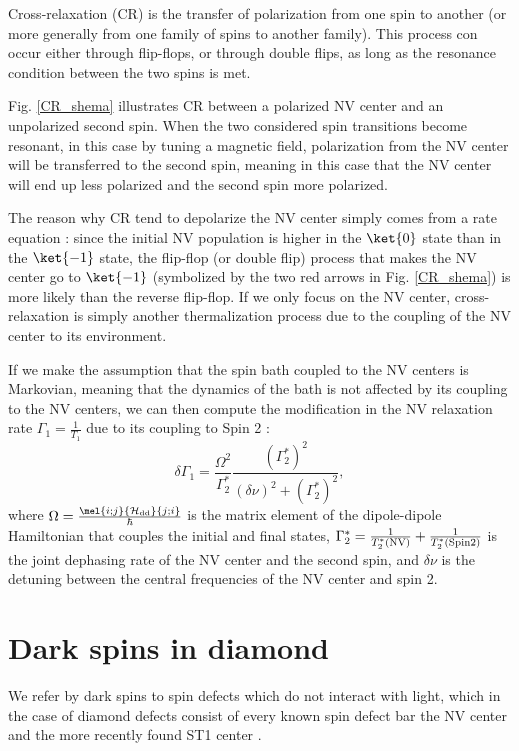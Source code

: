 \documentclass[a4paper]{report}
\begin{document}
Cross-relaxation (CR) is the transfer of polarization from one spin to another (or more generally from one family of spins to another family). This process con occur either through flip-flops, or through double flips, as long as the resonance condition between the two spins is met. 

Fig. \ref{CR_shema} illustrates CR between a polarized NV center and an unpolarized second spin. When the two considered spin transitions become resonant, in this case by tuning a magnetic field, polarization from the NV center will be transferred to the second spin, meaning in this case that the NV center will end up less polarized and the second spin more polarized. 

The reason why CR tend to depolarize the NV center simply comes from a rate equation : since the initial NV population is higher in the $\ket{0}$ state than in the $\ket{-1}$ state, the flip-flop (or double flip) process that makes the NV center go to $\ket{-1}$ (symbolized by the two red arrows in Fig. \ref{CR_shema}) is more likely than the reverse flip-flop. If we only focus on the NV center, cross-relaxation is simply another thermalization process due to the coupling of the NV center to its environment.

If we make the assumption that the spin bath coupled to the NV centers is Markovian, meaning that the dynamics of the bath is not affected by its coupling to the NV centers, we can then compute the modification in the NV relaxation rate $\Gamma_1=\frac{1}{T_1}$ due to its coupling to Spin 2 \citep{hall2016detection}:
\begin{equation}
\delta \Gamma_1=\frac{\Omega^2}{\Gamma_2^*} \frac{(\Gamma_2^*)^2}{(\delta \nu)^2+(\Gamma_2^*)^2},
\label{delta gamma 1}
\end{equation}
where $\Omega=\frac{\mel{i;j}{\mathcal{H}_{\rm dd}}{j;i}}{\hbar}$ is the matrix element of the dipole-dipole Hamiltonian that couples the initial and final states, $\Gamma_2^*=\frac{1}{T_2^*(\rm NV)}+\frac{1}{T_2^*(\rm Spin 2)}$ is the joint dephasing rate of the NV center and the second spin, and $\delta \nu$ is the detuning between the central frequencies of the NV center and spin 2.
\section{Dark spins in diamond}

We refer by dark spins to spin defects which do not interact with light, which in the case of diamond defects consist of every known spin defect bar the NV center and the more recently found ST1 center \citep{lee2013readout, john2017bright}.
\end{document}
